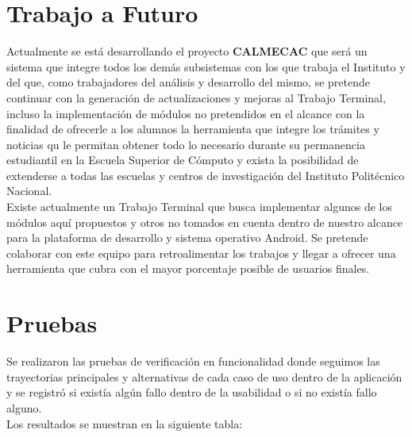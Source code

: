 %
%
%
%


\section{Trabajo a Futuro}

Actualmente se está desarrollando el proyecto \textbf{CALMECAC} que será un sistema que integre todos los demás subsistemas con los que trabaja el Instituto y del que, como trabajadores del análisis y desarrollo del mismo, se pretende continuar con la generación de actualizaciones y mejoras al Trabajo Terminal, incluso la implementación de módulos no pretendidos en el alcance con la finalidad de ofrecerle a los alumnos la herramienta que integre los trámites y noticias qu le permitan obtener todo lo necesario durante su permanencia estudiantil en la Escuela Superior de Cómputo y exista la posibilidad de extenderse a todas las escuelas y centros de investigación del Instituto Politécnico Nacional. \\

Existe actualmente un Trabajo Terminal que busca implementar algunos de los módulos aquí propuestos y otros no tomados en cuenta dentro de nuestro alcance para la plataforma de desarrollo y sistema operativo Android. Se pretende colaborar con este equipo para retroalimentar los trabajos y llegar a ofrecer una herramienta que cubra con el mayor porcentaje posible de usuarios finales. \\

\section{Pruebas}

Se realizaron las pruebas de verificación en funcionalidad donde seguimos las trayectorias principales y alternativas de cada caso de uso dentro de la aplicación y se registró si existía algún fallo dentro de la usabilidad o si no existía fallo alguno. \\
Los resultados se muestran en la siguiente tabla: \\

